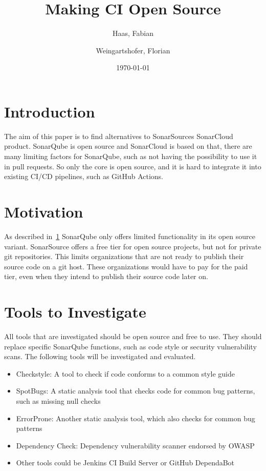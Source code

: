 \documentclass[11pt,journal]{IEEEtran}
\title{Making CI Open Source}
\author{
    Haas, Fabian\\
    \and
    Weingartshofer, Florian
}
\date{\today}
\begin{document}
    \maketitle


    \section{Introduction}\label{sec:introduction}
    The aim of this paper is to find alternatives to SonarSources SonarCloud product.
    SonarQube is open source and SonarCloud is based on that, there are many limiting factors for SonarQube, such as not having the possibility to use it in pull requests.
    So only the core is open source, and it is hard to integrate it into existing CI/CD pipelines, such as GitHub Actions.

    \section{Motivation}\label{sec:motivation}
    As described in\ \ref{sec:introduction} SonarQube only offers limited functionality in its open source variant.
    SonarSource offers a free tier for open source projects, but not for private git repositories.
    This limits organizations that are not ready to publish their source code on a git host.
    These organizations would have to pay for the paid tier, even when they intend to publish their source code later on.

    \section{Tools to Investigate}\label{sec:tools-to-investigate}
    All tools that are investigated should be open source and free to use.
    They should replace specific SonarQube functions, such as code style or security vulnerability scans.
    The following tools will be investigated and evaluated.
    \begin{itemize}
        \item Checkstyle: A tool to check if code conforms to a common style guide
        \item SpotBugs: A static analysis tool that checks code for common bug patterns, such as missing null checks
        \item ErrorProne: Another static analysis tool, which also checks for common bug patterns
        \item Dependency Check: Dependency vulnerability scanner endorsed by OWASP
        \item Other tools could be Jenkins CI Build Server or GitHub DependaBot
    \end{itemize}
\end{document}

